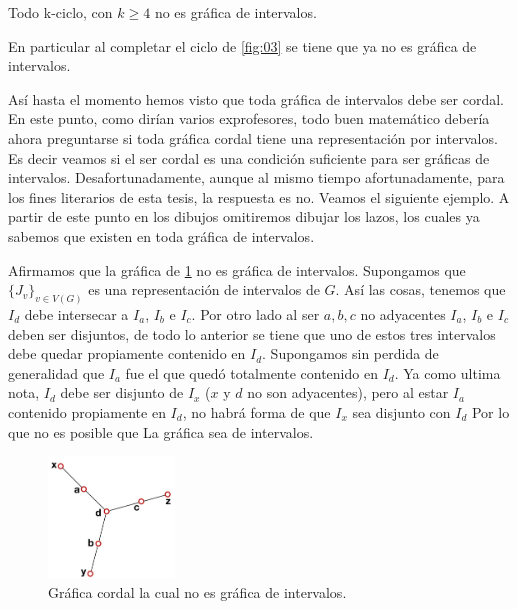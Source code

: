 \begin{corolario}
    Todo k-ciclo, con $k \geq 4$ no es gráfica de intervalos. 
\end{corolario}

En particular al completar el ciclo de \cref{fig:03} se tiene que ya no es gráfica de intervalos.

Así hasta el momento hemos visto que toda gráfica de intervalos debe ser cordal. En este punto, como dirían varios exprofesores, todo buen matemático debería ahora preguntarse si toda gráfica cordal tiene una representación por intervalos. Es decir veamos si el ser cordal es una condición suficiente para ser gráficas de intervalos.
Desafortunadamente, aunque al mismo tiempo afortunadamente, para los fines literarios de esta tesis, la respuesta es no.
Veamos el siguiente ejemplo. A partir de este punto en los dibujos omitiremos dibujar los lazos, los cuales ya sabemos que existen en toda gráfica de intervalos.


Afirmamos que la gráfica de \cref{fig:GrafCrdlnodeInt} no es gráfica de intervalos. Supongamos que $ \{ J_v \}_{v\in V(G)}$ es una representación de intervalos de $G$. 
Así las cosas, tenemos que $I_d$ debe intersecar a $I_a$, $I_b$ e $I_c$. Por otro lado al ser $a,b,c$ no adyacentes $I_a$, $I_b$ e $I_c$ deben ser disjuntos, de todo lo anterior se tiene que uno de estos tres intervalos debe quedar propiamente contenido en $I_d$.
Supongamos sin perdida de generalidad que $I_a$ fue el que quedó totalmente contenido en $I_d$. 
Ya como ultima nota, $I_d$ debe ser disjunto de $I_x$  ($x$ y $d$ no son adyacentes), pero al estar $I_a$ contenido propiamente en $I_d$, no habrá forma de que $I_x$ sea disjunto con $I_d$ Por lo que no es posible que La gráfica sea de intervalos.

\begin{figure}[H]
  \centering
  \includegraphics[width=0.3\textwidth]{recursos/capturas/204.jpg}
  \caption{Gráfica cordal la cual no es gráfica de intervalos.}
  \label{fig:GrafCrdlnodeInt}
\end{figure}

